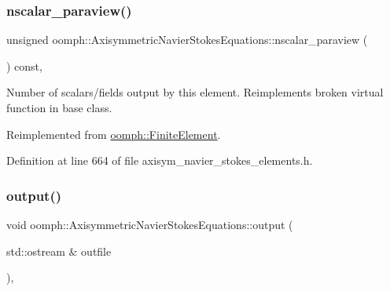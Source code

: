 \mbox{\label{classoomph_1_1AxisymmetricNavierStokesEquations_a1383f2cbddcd5a9b69ed41aab82dca36}} 
\subsubsection{\texorpdfstring{nscalar\+\_\+paraview()}{nscalar\_paraview()}}
{\footnotesize\ttfamily unsigned oomph\+::\+Axisymmetric\+Navier\+Stokes\+Equations\+::nscalar\+\_\+paraview (\begin{DoxyParamCaption}{ }\end{DoxyParamCaption}) const\hspace{0.3cm}{\ttfamily [inline]}, {\ttfamily [virtual]}}



Number of scalars/fields output by this element. Reimplements broken virtual function in base class. 



Reimplemented from \hyperlink{classoomph_1_1FiniteElement_a865e2e5586552ba80babdbe26a77fe8c}{oomph\+::\+Finite\+Element}.



Definition at line 664 of file axisym\+\_\+navier\+\_\+stokes\+\_\+elements.\+h.

\mbox{\label{classoomph_1_1AxisymmetricNavierStokesEquations_afe0c7b607ec3fd03a73b7db4f1fe6252}} 
\subsubsection{\texorpdfstring{output()}{output()}\hspace{0.1cm}{\footnotesize\ttfamily [1/4]}}
{\footnotesize\ttfamily void oomph\+::\+Axisymmetric\+Navier\+Stokes\+Equations\+::output (\begin{DoxyParamCaption}\item[{std\+::ostream \&}]{outfile }\end{DoxyParamCaption})\hspace{0.3cm}{\ttfamily [inline]}, {\ttfamily [virtual]}}



